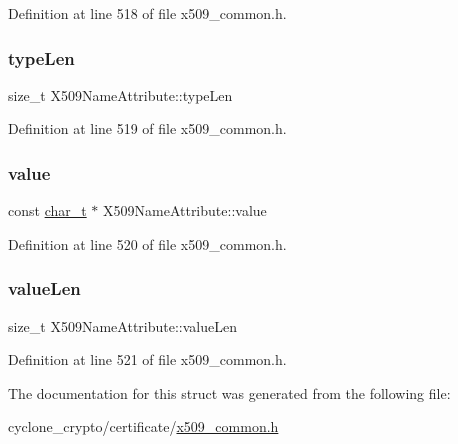 Definition at line 518 of file x509\+\_\+common.\+h.

\mbox{\label{structX509NameAttribute_ac57d67161545c7a78f8997eac569320a}} 
\subsubsection{\texorpdfstring{type\+Len}{typeLen}}
{\footnotesize\ttfamily size\+\_\+t X509\+Name\+Attribute\+::type\+Len}



Definition at line 519 of file x509\+\_\+common.\+h.

\mbox{\label{structX509NameAttribute_a282b457c4732701132df0b293cb7910c}} 
\subsubsection{\texorpdfstring{value}{value}}
{\footnotesize\ttfamily const \hyperlink{compiler__port_8h_a40bb5262bf908c328fbcfbe5d29d0201}{char\+\_\+t} $\ast$ X509\+Name\+Attribute\+::value}



Definition at line 520 of file x509\+\_\+common.\+h.

\mbox{\label{structX509NameAttribute_a265bb7fc7ba14428f029b10c2bd9db9d}} 
\subsubsection{\texorpdfstring{value\+Len}{valueLen}}
{\footnotesize\ttfamily size\+\_\+t X509\+Name\+Attribute\+::value\+Len}



Definition at line 521 of file x509\+\_\+common.\+h.



The documentation for this struct was generated from the following file\+:\begin{DoxyCompactItemize}
\item 
cyclone\+\_\+crypto/certificate/\hyperlink{certificate_2x509__common_8h}{x509\+\_\+common.\+h}\end{DoxyCompactItemize}
